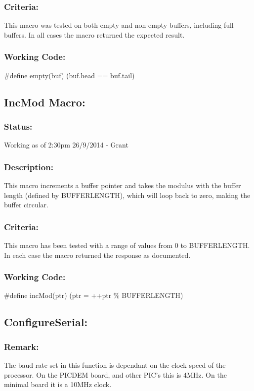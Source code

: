 \documentclass[]{article}
\begin{document}
\subsubsection{Criteria:}
This macro was tested on both empty and non-empty buffers, including full buffers. In all cases the macro returned the expected result.

\subsubsection{Working Code:}
\#define empty(buf) (buf.head == buf.tail)

\subsection{IncMod Macro:}
\subsubsection{Status:}
Working as of 2:30pm 26/9/2014 - Grant

\subsubsection{Description:}
This macro increments a buffer pointer and takes the modulus with the buffer length (defined by BUFFERLENGTH), which will loop back to zero, making the buffer circular.

\subsubsection{Criteria:}
This macro has been tested with a range of values from 0 to BUFFERLENGTH. In each case the macro returned the response as documented.

\subsubsection{Working Code:}
\#define incMod(ptr) (ptr = ++ptr \% BUFFERLENGTH)

\subsection{ConfigureSerial:}
\subsubsection{Remark:}
The baud rate set in this function is dependant on the clock speed of the processor. On the PICDEM board, and other PIC's this is 4MHz. On the minimal board it is a 10MHz clock.
\end{document}
